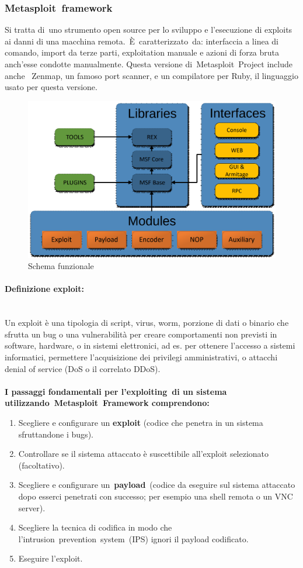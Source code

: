 \documentclass{article}
\begin{document}
\subsubsection{Metasploit framework}
Si tratta di uno strumento open source per lo sviluppo e l'esecuzione di exploits ai danni di una macchina 
remota. È caratterizzato da: interfaccia a linea di comando, import da terze parti, exploitation manuale e 
azioni di forza bruta anch’esse condotte manualmente. Questa versione di Metasploit Project include anche 
Zenmap, un famoso port scanner, e un compilatore per Ruby, il linguaggio usato per questa versione. 
\begin{figure}[H]
    \center
    \includegraphics[scale=0.3]{images/SchemaMetasploit.png}
    \caption{Schema funzionale}\label{fig:1}
\end{figure}
\paragraph{Definizione exploit:} \\
Un exploit è una tipologia di script, virus, worm, porzione di dati o binario che sfrutta un bug 
o una vulnerabilità per creare comportamenti non previsti in software, hardware, o in sistemi elettronici, 
ad es. per ottenere l'accesso a sistemi informatici, permettere l'acquisizione dei privilegi amministrativi, 
o attacchi denial of service (DoS o il correlato DDoS). \\\\
\textbf{I passaggi fondamentali per l'exploiting di un sistema utilizzando Metasploit Framework comprendono:}
\begin{enumerate}
    \item Scegliere e configurare un \textbf{exploit} (codice che penetra in un sistema sfruttandone i bugs). 
    \item Controllare se il sistema attaccato è suscettibile all’exploit selezionato (facoltativo).
    \item Scegliere e configurare un \textbf{payload} (codice da eseguire sul sistema attaccato dopo esserci 
    penetrati con successo; per esempio una shell remota o un VNC server).
    \item Scegliere la tecnica di codifica in modo che l’intrusion prevention system (IPS) ignori il payload 
    codificato. 
    \item Eseguire l’exploit.
\end{enumerate}
\end{document}
